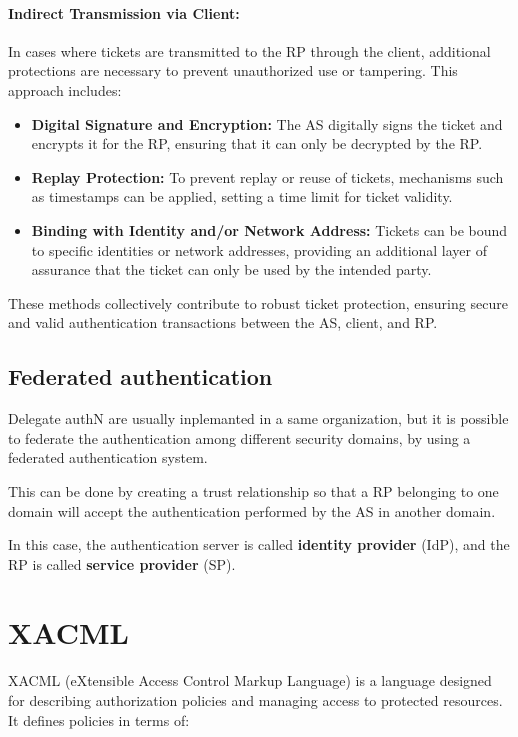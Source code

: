 \paragraph{Indirect Transmission via Client:}
In cases where tickets are transmitted to the RP through the client,
additional protections are necessary to prevent unauthorized use or
tampering. This approach includes:
\begin{itemize}
    \item \textbf{Digital Signature and Encryption:} The AS digitally
      signs the ticket and encrypts it for the RP, ensuring that it
      can only be decrypted by the RP.
    \item \textbf{Replay Protection:} To prevent replay or reuse of
      tickets, mechanisms such as timestamps can be applied, setting a
      time limit for ticket validity.
    \item \textbf{Binding with Identity and/or Network Address:}
      Tickets can be bound to specific identities or network
      addresses, providing an additional layer of assurance that the
      ticket can only be used by the intended party.
\end{itemize}

These methods collectively contribute to robust ticket protection,
ensuring secure and valid authentication transactions between the AS,
client, and RP.


\subsection{Federated authentication}
Delegate authN are usually inplemanted in a same organization, but it
is possible to federate the authentication among different security
domains, by using a federated authentication system.

This can be done by creating a trust relationship so that a RP
belonging to one domain will accept the authentication performed by
the AS in another domain.

In this case, the authentication server is called \textbf{identity 
provider} (IdP), and the RP is called \textbf{service provider} (SP).
\section{XACML}
XACML (eXtensible Access Control Markup Language) is a language
designed for describing authorization policies and managing access to
protected resources. It defines policies in terms of:

